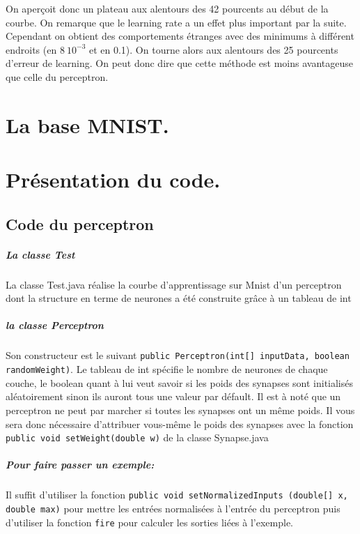 \documentclass[a4paper,twoside]{report}
\begin{document}
On aperçoit donc un plateau aux alentours des 42 pourcents au début de la courbe. On remarque que le learning rate a un effet plus important par la suite. Cependant on obtient des comportements étranges avec des minimums à différent endroits (en $8 \ 10^{-3}$ et en 0.1). On tourne alors aux alentours des 25 pourcents d'erreur de learning. On peut donc dire que cette méthode est moins avantageuse que celle du perceptron.

    \appendix

        \chapter{La base MNIST.}

        \chapter{Présentation du code.}
        
\section{Code du perceptron}

\paragraph*{La classe Test} La classe Test.java réalise la courbe d'apprentissage sur Mnist d'un perceptron dont la structure en terme de neurones a été construite grâce à un tableau de int

\paragraph*{la classe Perceptron} Son constructeur est le suivant \texttt{public Perceptron(int[] inputData, boolean randomWeight)}. Le tableau de int spécifie le nombre de neurones de chaque couche, le boolean quant à lui veut savoir si les poids des synapses sont initialisés aléatoirement sinon ils auront tous une valeur par défault. Il est à noté que un perceptron ne peut par marcher si toutes les synapses ont un même poids. Il vous sera donc nécessaire d'attribuer vous-même le poids des synapses avec la fonction \texttt{public void setWeight(double w)} de la classe Synapse.java

\paragraph*{Pour faire passer un exemple:} Il suffit d'utiliser la fonction \texttt{public void setNormalizedInputs (double[] x, double max)} pour mettre les entrées normalisées à l'entrée du perceptron puis d'utiliser la fonction \texttt{fire} pour calculer les sorties liées à l'exemple.
\end{document}
